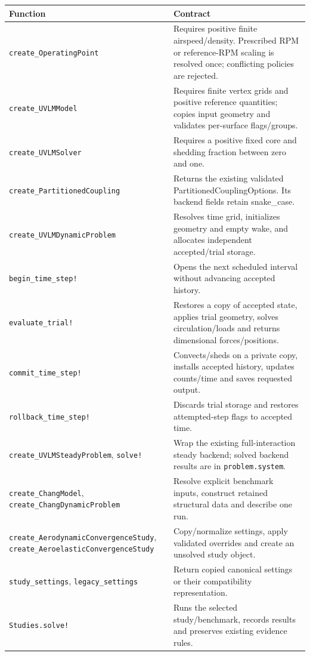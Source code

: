 \documentclass[11pt,a4paper]{article}
\newcommand{\code}{\nolinkurl}
\begin{document}
\begin{longtable}{@{}L{.36\linewidth}L{.56\linewidth}@{}}
\toprule Function & Contract\\\midrule\endhead
\code{create_OperatingPoint} & Requires positive finite airspeed/density. Prescribed RPM or reference-RPM scaling is resolved once; conflicting policies are rejected.\\
\code{create_UVLMModel} & Requires finite vertex grids and positive reference quantities; copies input geometry and validates per-surface flags/groups.\\
\code{create_UVLMSolver} & Requires a positive fixed core and shedding fraction between zero and one.\\
\code{create_PartitionedCoupling} & Returns the existing validated PartitionedCouplingOptions. Its backend fields retain snake\_case.\\
\code{create_UVLMDynamicProblem} & Resolves time grid, initializes geometry and empty wake, and allocates independent accepted/trial storage.\\
\code{begin_time_step!} & Opens the next scheduled interval without advancing accepted history.\\
\code{evaluate_trial!} & Restores a copy of accepted state, applies trial geometry, solves circulation/loads and returns dimensional forces/positions.\\
\code{commit_time_step!} & Convects/sheds on a private copy, installs accepted history, updates counts/time and saves requested output.\\
\code{rollback_time_step!} & Discards trial storage and restores attempted-step flags to accepted time.\\
\code{create_UVLMSteadyProblem}, \code{solve!} & Wrap the existing full-interaction steady backend; solved backend results are in \code{problem.system}.\\
\code{create_ChangModel}, \code{create_ChangDynamicProblem} & Resolve explicit benchmark inputs, construct retained structural data and describe one run.\\
\code{create_AerodynamicConvergenceStudy}, \code{create_AeroelasticConvergenceStudy} & Copy/normalize settings, apply validated overrides and create an unsolved study object.\\
\code{study_settings}, \code{legacy_settings} & Return copied canonical settings or their compatibility representation.\\
\code{Studies.solve!} & Runs the selected study/benchmark, records results and preserves existing evidence rules.\\
\bottomrule
\end{longtable}
\end{document}
